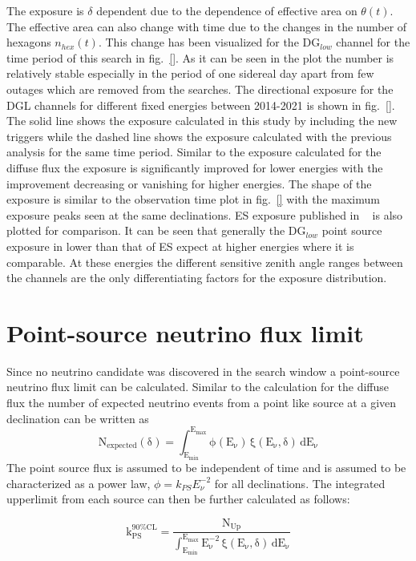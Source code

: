 The exposure is $\delta$ dependent due to the dependence of effective area on $\theta(t)$. The effective area can also change with time due to the changes in the number of hexagons $n_{hex}(t)$. This change has been visualized for the DG$_{low}$ channel for the time period of this search in fig.~\ref{}. As it can be seen in the plot the number is relatively stable especially in the period of one sidereal day apart from few outages which are removed from the searches. The directional exposure for the DGL channels for different fixed energies between 2014-2021 is shown in fig.~\ref{}. The solid line shows the exposure calculated in this study by including the new triggers while the dashed line shows the exposure calculated with the previous analysis for the same time period. Similar to the exposure calculated for the diffuse flux the exposure is significantly improved for lower energies with the improvement decreasing or vanishing for higher energies. The shape of the exposure is similar to the observation time plot in fig.~\ref{} with the maximum exposure peaks seen at the same declinations. ES exposure published in ~\cite{} is also plotted for comparison. It can be seen that generally the DG$_{low}$ point source exposure in lower than that of ES expect at higher energies where it is comparable. At these energies the different sensitive zenith angle ranges between the channels are the only differentiating factors for the exposure distribution. 

\section{Point-source neutrino flux limit}
\label{sec:pfux_limit}
Since no neutrino candidate was discovered in the search window a point-source neutrino flux limit can be calculated. Similar to the calculation for the diffuse flux the number of expected neutrino events from a point like source at a given declination can be written as 
\begin{equation}
  \mathrm{N_{expected}(\delta) = \int_{E_{min}}^{E_{max}}  \phi(E_{\nu}) \, \xi(E_{\nu}, \delta) \, dE_{\nu}}
\end{equation}
The point source flux is assumed to be independent of time and is assumed to be characterized as a power law, $\phi = k_{PS} E_{\nu}^{-2}$ for all declinations. The integrated upperlimit from each source can then be further calculated as follows:

\begin{equation}
  \label{eq:point_flux_limit}
  \mathrm{k_{PS}^{90\%CL} = \frac{N_{Up}}{\int_{E_{min}}^{E_{max}} E_{\nu}^{-2} \, \xi(E_{\nu}, \delta) \, dE_{\nu}}}
\end{equation}

